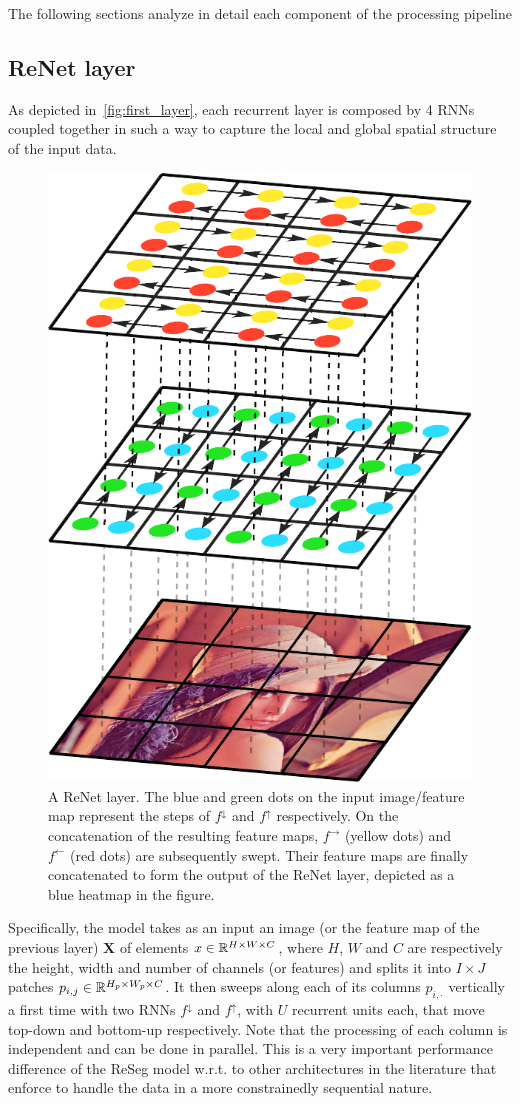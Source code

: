 The following sections analyze in detail each component of the processing
pipeline

\subsection{ReNet layer}

As depicted in~\autoref{fig:first_layer}, each recurrent layer is composed
by 4 RNNs coupled together in such a way to capture the local and global
spatial structure of the input data.

\begin{figure}[t]
    \begin{center}
        \includegraphics[width=0.3\columnwidth]{img/reseg/first_layer.pdf}
        \caption{A ReNet layer. The blue and green dots on the input
            image/feature map represent the steps of $f^{\downarrow}$ and
            $f^{\uparrow}$ respectively. On the concatenation of the resulting
            feature maps, $f^{\rightarrow}$ (yellow dots) and $f^{\leftarrow}$
            (red dots) are subsequently swept. Their feature maps are finally
            concatenated to form the output of the ReNet layer, depicted as a
            blue heatmap in the figure.}
        \label{fig:first_layer}
        \vspace{-5mm}
    \end{center}
\end{figure}


Specifically, the model takes as an input an image (or the feature map of the
previous layer) $\mathbf{X}$ of elements $x \in \mathbb{R}^{H \times W \times C}$,
where $H$, $W$ and $C$ are respectively the height, width and number of
channels (or features) and splits it into $I \times J$ patches $p_{i,j} \in
\mathbb{R}^{H_p \times W_p \times C}$. It then sweeps along each of its columns
$p_{i,\cdot}$ vertically a first time with two RNNs $f^{\downarrow}$ and
$f^{\uparrow}$, with $U$ recurrent units each, that move top-down and bottom-up
respectively. Note that the processing of each column is independent and can be
done in parallel. This is a very important performance difference of the ReSeg
model w.r.t. to other architectures in the literature that enforce to handle
the data in a more constrainedly sequential nature.

